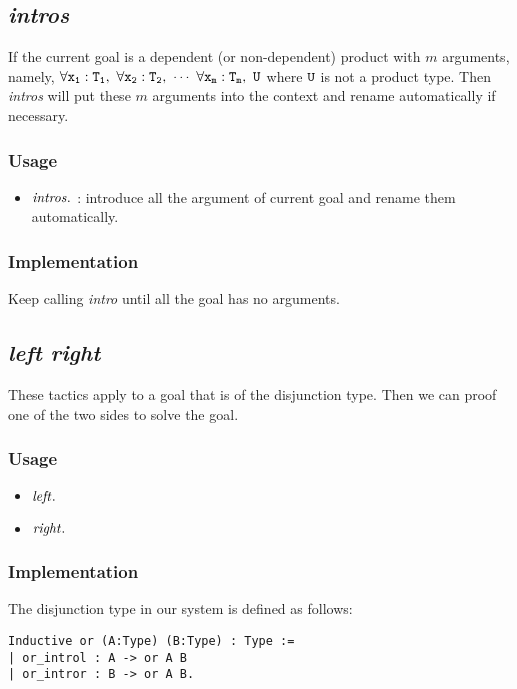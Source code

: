 \subsection{\it intros}

If the current goal is a dependent (or non-dependent) product with $m$ arguments, namely,
$\tt \forall x_1:T_1,\ \forall x_2:T_2,\ \cdots\ \forall x_m:T_m,\ U$ where $\tt U$ is not a product type.
Then \textit{intros} will put these $m$ arguments into the context and rename automatically if necessary.

\subsubsection*{Usage}
\begin{itemize}
\item ${\it intros}.$ : introduce all the argument of current goal and rename them automatically.
\end{itemize}

\subsubsection*{Implementation}
Keep calling {\it intro} until all the goal has no arguments.

\subsection{\it left right}
These tactics apply to a goal that is of the disjunction type. Then we can proof one of the two sides to solve the goal.

\subsubsection*{Usage}
\begin{itemize}
    \item ${\it left}.$
    \item ${\it right}.$
\end{itemize}

\subsubsection*{Implementation}
The disjunction type in our system is defined as follows:
\begin{center}
\begin{minipage}{0.6\textwidth}
\begin{verbatim}
Inductive or (A:Type) (B:Type) : Type :=
| or_introl : A -> or A B
| or_intror : B -> or A B. 
\end{verbatim}
\end{minipage}
\end{center}

